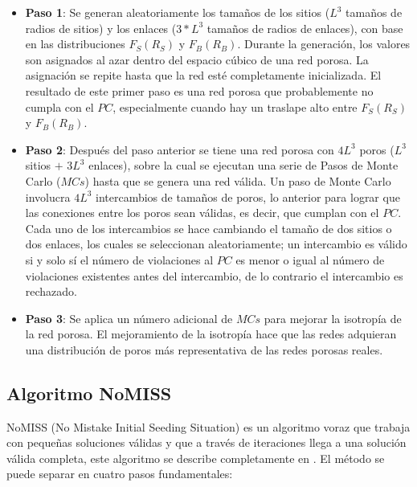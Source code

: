 \begin{itemize}
\item[] \textbf{Paso 1}:
Se generan aleatoriamente los tamaños de los sitios 
($L^3$ tamaños de radios de sitios) y los enlaces ($3*L^3$ tamaños de radios de enlaces), con base en las 
distribuciones $F_S(R_S)$ y $F_B(R_B)$. Durante la generación, los valores 
son asignados al azar dentro del espacio cúbico de una red porosa.
La asignación se repite hasta que la red esté completamente inicializada. El resultado de este primer paso es una red porosa que 
probablemente no cumpla con el $PC$, especialmente cuando hay un traslape alto entre $F_S(R_S)$ y $F_B(R_B)$.\\
\item[] \textbf{Paso 2}:
Después del paso anterior se tiene una red porosa con $4L^3$ poros ($L^3$ sitios $+$ $3L^3$ enlaces), sobre la cual se ejecutan una serie de Pasos de Monte Carlo ($MCs$) hasta que se genera una red válida. 
Un paso de Monte Carlo involucra $4L^3$ intercambios de tamaños de poros, lo anterior para lograr que las 
conexiones entre los poros sean válidas, es decir, que cumplan con el $PC$. Cada uno de los intercambios se hace cambiando el tamaño de 
dos sitios o dos enlaces, los cuales se seleccionan aleatoriamente; un intercambio es válido si y solo sí el número de violaciones al 
$PC$ es menor o igual al número de violaciones existentes antes del intercambio, de lo contrario el intercambio es rechazado.\\
\item[] \textbf{Paso 3}:
Se aplica un número adicional de $MCs$ para mejorar la isotropía de la red porosa. El mejoramiento de la isotropía 
hace que las redes adquieran una distribución de poros más representativa de las redes porosas reales.  
\end{itemize}

\subsection{Algoritmo NoMISS}
\label{subsubsec:nomiss}
NoMISS (No Mistake Initial Seeding Situation) es un algoritmo voraz que trabaja con pequeñas soluciones válidas y que a través de 
iteraciones llega a una solución válida completa, este algoritmo se describe completamente en \cite{ref3}. El método se puede separar
en cuatro pasos fundamentales:

